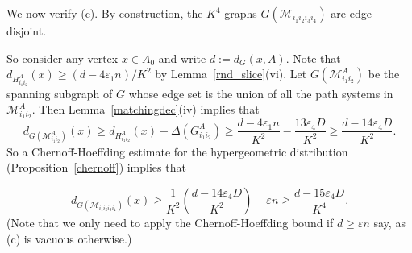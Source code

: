 \documentclass{memo-l}
\def\COMMENT#1{}
\def\cM{\mathcal{M}}
\def\eps{\varepsilon}
\def\I{i_1,i_2,i_3,i_4}
\numberwithin{section}{chapter}
\numberwithin{equation}{section}
\numberwithin{firstthm}{section}
\numberwithin{figure}{section}
\begin{document}
{We now verify (c). By construction, the $K^4$ graphs $G(\cM_{i_1i_2i_3i_4})$ are edge-disjoint.%
   \COMMENT{Daniela: new sentence}
So consider any vertex $x\in A_0$ and
write $d:=d_G(x,A)$. Note that $d_{H_{i_1i_2}^A}(x)\ge (d-4 \eps_1 n)/K^2$
by Lemma~\ref{rnd_slice}(vi). Let $G(\cM_{i_1i_2}^A)$ be the spanning subgraph of $G$ whose edge set is the union of all the path systems
in $\cM_{i_1i_2}^A$. Then Lemma~\ref{matchingdec}(iv) implies that
$$
d_{G(\cM_{i_1i_2}^A)}(x)\ge d_{H_{i_1 i_2}^A}(x)-  \Delta (G^A _{i_1 i_2} )  \ge \frac{d-4\eps_1 n}{K^2} -\frac{13\eps_4D}{K^2} 
\ge \frac{d-14\eps_4 D}{K^2}.
$$
So a Chernoff-Hoeffding estimate for the hypergeometric distribution (Proposition~\ref{chernoff}) implies that%
\COMMENT{This equation follows by up to \emph{four} applications of Chernoff.
Consider the set of large path systems $\mathcal M^L$ in $\mathcal M ^A _{i_1,i_2}$.
Let $\mathcal M ^L _x $ denote the set of path systems in $\mathcal M^L$ that contain at least one edge at $x$. 
Let $\mathcal M ^{L2} _x $ denote the set of path systems in $\mathcal M^L$ that contain two edges at $x$. 
Let $X$ be (the random variable) the number of large path systems in $\mathcal M^L_x$ that are assigned to $\mathcal M_{\I}$.
So $X$ has hypergeometric distribution. In particular, $\mathbb E (X)=
|\mathcal M^L _x|/K^2$. 
Let $X_2$ be (the random variable) the number of large path systems in $\mathcal M^{L2}_x$ that are assigned to $\mathcal M_{\I}$.
So $X_2$ has hypergeometric distribution. In particular, $\mathbb E (X_2)=
|\mathcal M^{L2} _x|/K^2$. 
\\
Define $\mathcal M^S$, $\mathcal M^S _x$ and $\mathcal M^{S2} _x$ analogously for small path systems. Let $Y$ be (the random variable)
the number of small path systems in $\mathcal M^S _x$ that are assigned to $\mathcal M_{\I}$. So $Y$ has hypergeometric distribution. In particular, $\mathbb E (Y)=
|\mathcal M^S _x|/K^2$.
Let $Y_2$ be (the random variable) the number of small path systems in $\mathcal M^{S2} _x$ that are assigned to $\mathcal M_{\I}$.
So $Y_2$ has hypergeometric distribution. In particular, $\mathbb E (Y_2)=
|\mathcal M^{S2} _x|/K^2$.
\\
Further, note that $X+Y+X_2+Y_2=d_{G(\cM_{i_1i_2i_3i_4})}(x)$ and 
$|\mathcal M^S_x|+|\mathcal M^L_x|+|\mathcal M^{S2}_x|+|\mathcal M^{L2}_x| = d_{G(\cM_{i_1i_2}^A)}(x) \geq \frac{d-14\eps_4 D}{K^2}.$
The result now follows by applying Chernoff-Hoeffding at most four times. (We don't need to apply it e.g. if
$|\mathcal M^L_x| \leq \eps n/4 $ say.)}
$$
d_{G(\cM_{i_1i_2i_3i_4})}(x)\ge \frac{1}{K^2} \left( \frac{d-14\eps_4 D}{K^2} \right)  -\eps n
\ge \frac{d-15\eps_4 D}{K^4}.
$$
(Note that we only need to apply the Chernoff-Hoeffding bound if $d \ge \eps n$ say, as (c) is vacuous otherwise.)

}
\end{document}
